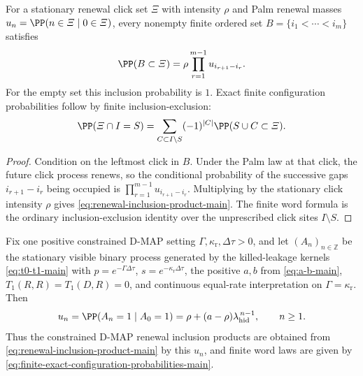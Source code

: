 \begin{corollary}\label{cor:renewal-principal-minor-word-law-main}
For a stationary renewal click set \(\varXi\) with intensity \(\rho\) and Palm
renewal masses \(u_n=\PP(n\in\varXi\mid0\in\varXi)\), every nonempty finite
ordered set \(B=\{i_1<\cdots<i_m\}\) satisfies
\begin{equation}\label{eq:renewal-inclusion-product-main}
\PP(B\subset\varXi)
=\rho\prod_{r=1}^{m-1}u_{i_{r+1}-i_r}.
\end{equation}
For the empty set this inclusion probability is \(1\).  Exact finite
configuration probabilities follow by finite inclusion-exclusion:
\begin{equation}\label{eq:finite-exact-configuration-probabilities-main}
\PP(\varXi\cap I=S)
=\sum_{C\subset I\setminus S}(-1)^{|C|}
\PP(S\cup C\subset\varXi).
\end{equation}
\end{corollary}

\begin{proof}
Condition on the leftmost click in \(B\).  Under the Palm law at that click,
the future click process renews, so the conditional probability of the
successive gaps \(i_{r+1}-i_r\) being occupied is
\(\prod_{r=1}^{m-1}u_{i_{r+1}-i_r}\).  Multiplying by the stationary click
intensity \(\rho\) gives \eqref{eq:renewal-inclusion-product-main}.  The
finite word formula is the ordinary inclusion-exclusion identity over the
unprescribed click sites \(I\setminus S\).
\end{proof}

\begin{lemma}\label{lem:constrained-dmap-renewal-product-specialization-main}
Fix one positive constrained D-MAP setting
\(\Gamma,\kappa_{\mathrm r},\Delta\tau>0\), and let
\((A_n)_{n\in\mathbb Z}\) be the stationary visible binary process generated
by the killed-leakage kernels \eqref{eq:t0-t1-main} with
\(p=e^{-\Gamma\Delta\tau}\), \(s=e^{-\kappa_{\mathrm r}\Delta\tau}\), the
positive \(a,b\) from \eqref{eq:a-b-main}, \(T_1(R,R)=T_1(D,R)=0\), and
continuous equal-rate interpretation on \(\Gamma=\kappa_{\mathrm r}\).  Then
\begin{equation}\label{eq:finite-inclusion-u-n-main}
u_n=\PP(A_n=1\mid A_0=1)
=\rho+(a-\rho)\lambda_{\mathrm{hid}}^{\,n-1},
\qquad n\ge1.
\end{equation}
Thus the constrained D-MAP renewal inclusion products are obtained from
\eqref{eq:renewal-inclusion-product-main} by this \(u_n\), and finite word
laws are given by
\eqref{eq:finite-exact-configuration-probabilities-main}.
\end{lemma}

